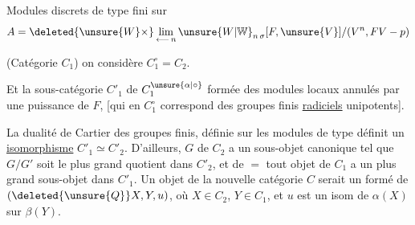 
Modules discrets  de type fini sur
\[
A=\deleted{\unsure{W}\times}\lim_{\longleftarrow\,n}\unsure{W|\mathbb W}_{n\,\sigma}[F,\unsure{V}]/(V^n,FV-p)
\]

(Catégorie $C_1$) on considère $C_1^\circ=C_2$.

Et la sous-catégorie  $C'_1$ de $C_1^{\unsure{\alpha|\circ}}$ formée des modules locaux annulés par une puissance de $F$, [qui en $C_1^\circ$ correspond    des groupes finis \uline{radiciels} unipotents].


La dualité de Cartier des groupes finis, définie  sur les modules de type  définit un \uline{isomorphisme} $C'_1\simeq C'_2$.
D'ailleurs,  $G$ de $C_2$ a un sous-objet canonique tel que $G/G'$ soit le plus grand quotient dans $C'_2$, et de $=$ tout objet de $C_1$ a un plus grand sous-objet  dans $C'_1$. Un objet de la nouvelle catégorie $C$ serait un   formé de  $(\deleted{\unsure{Q}}X,Y,u)$, où $X\in C_2$, $Y\in C_1$, et $u$ est un isom de $\alpha(X)$ sur $\beta(Y)$.

